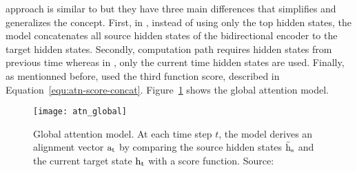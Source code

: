 \citet{1508.04025} approach is similar to \citet{1409.0473} but they have three main differences that simplifies and generalizes the concept. First, in \citet{1409.0473}, instead of using only the top hidden states, the model concatenates all source hidden states of the bidirectional encoder to the target hidden states.
Secondly, \citet{1409.0473} computation path requires hidden states from previous time whereas in \citet{1508.04025}, only the current time hidden states are used. Finally, as mentionned before, \citet{1409.0473} used the third function score, described in Equation~\ref{equ:atn-score-concat}.
Figure~\ref{fig:atn_global} shows the global attention model.

\begin{figure}
    \centering
    \texttt{[image: atn\_global]}
    \decoRule
    \caption[Global attention model]{Global attention model. At each time step $t$, the model derives an alignment vector $\rm{a}_t$ by comparing the source hidden states $\rm{\bar{h}}_s$ and the current target state $\rm{h}_t$ with a score function. Source:~\citet{1508.04025}}
    \label{fig:atn_global}
\end{figure}

